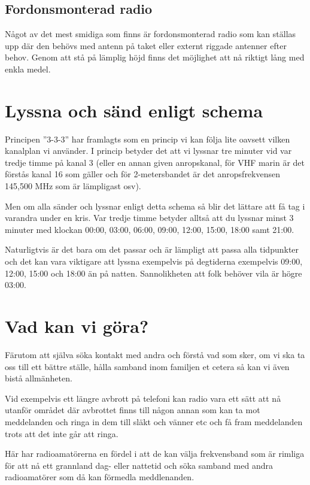 \subsection{Fordonsmonterad radio}

Något av det mest smidiga som finns är fordonsmonterad radio som kan ställas
upp där den behövs med antenn på taket eller externt riggade antenner efter
behov. Genom att stå på lämplig höjd finns det möjlighet att nå riktigt lång
med enkla medel.

\section{Lyssna och sänd enligt schema}

Principen ''3-3-3'' har framlagts som en princip vi kan följa lite oavsett vilken
kanalplan vi använder. I princip betyder det att vi lyssnar tre minuter vid
var tredje timme på kanal 3 (eller en annan given anropskanal, för VHF marin
är det förstås kanal 16 som gäller och för 2-metersbandet är det
anropsfrekvensen 145,500 MHz som är lämpligast osv).

Men om alla sänder och lyssnar enligt detta schema så blir det lättare att få
tag i varandra under en kris. Var tredje timme betyder alltså att du lyssnar
minst 3 minuter med klockan 00:00, 03:00, 06:00, 09:00, 12:00, 15:00, 18:00
samt 21:00.

Naturligtvis är det bara om det passar och är lämpligt att passa alla
tidpunkter och det kan vara viktigare att lyssna exempelvis på degtiderna
exempelvis 09:00, 12:00, 15:00 och 18:00 än på natten. Sannolikheten att folk
behöver vila är högre 03:00.

\section{Vad kan vi göra?}

Färutom att själva söka kontakt med andra och förstå vad som sker, om vi ska
ta oss till ett bättre ställe, hålla samband inom familjen et cetera så kan vi
även bistå allmänheten.

Vid exempelvis ett längre avbrott på telefoni kan radio vara ett sätt att nå
utanför området där avbrottet finns till någon annan som kan ta mot
meddelanden och ringa in dem till släkt och vänner etc och få fram meddelanden
trots att det inte går att ringa.

Här har radioamatörerna en fördel i att de kan välja frekvensband som är
rimliga för att nå ett grannland dag- eller nattetid och söka samband med
andra radioamatörer som då kan förmedla meddlenanden.

